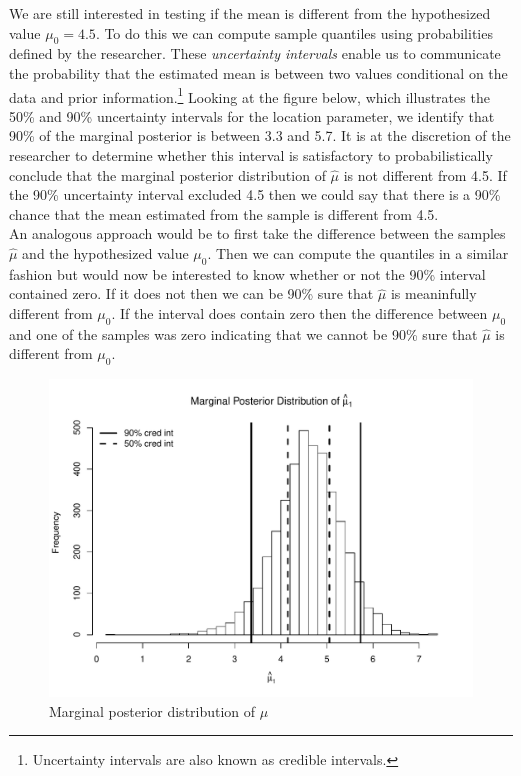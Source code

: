 \documentclass[12pt]{article}
\begin{document}
\begin{figure}[H]
\begin{minipage}{1\linewidth}
\footnotesize
\end{minipage}
\end{figure}

\noindent We are still interested in testing if the mean is different from the hypothesized value $\mu_0 = 4.5$. To do this we can compute sample quantiles using probabilities defined by the researcher. These \emph{uncertainty intervals} enable us to communicate the probability that the estimated mean is between two values conditional on the data and prior information.\footnote{Uncertainty intervals are also known as credible intervals.} Looking at the figure below, which illustrates the 50\% and 90\% uncertainty intervals for the location parameter, we identify that 90\% of the marginal posterior is between 3.3 and 5.7. It is at the discretion of the researcher to determine whether this interval is satisfactory to probabilistically conclude that the marginal posterior distribution of $\hat{\mu}$ is not different from 4.5. If the 90\% uncertainty interval excluded 4.5 then we could say that there is a 90\% chance that the mean estimated from the sample is different from 4.5. \\

\noindent An analogous approach would be to first take the difference between the samples $\hat{\mu}$ and the hypothesized value $\mu_0$. Then we can compute the quantiles in a similar fashion but would now be interested to know whether or not the 90\% interval contained zero. If it does not then we can be 90\% sure that $\hat{\mu}$ is meaninfully different from $\mu_0$. If the interval does contain zero then the difference between $\mu_0$ and one of the samples was zero indicating that we cannot be 90\% sure that $\hat{\mu}$ is different from $\mu_0$.

\begin{figure}[H]\caption[]{Marginal posterior distribution of $\mu$}
\centering
\begin{minipage}{0.6\linewidth}
\includegraphics[trim={0cm 0cm 0cm 1.5cm}, clip, scale=0.6]{../figs/norm1.pdf}
\end{minipage}
\end{figure}
\end{document}
